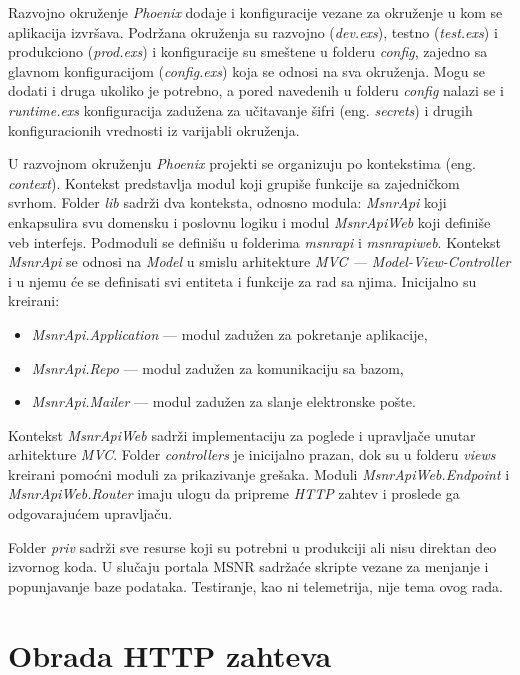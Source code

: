 \documentclass[12pt,oneside]{memoir}
\begin{document}
Razvojno okruženje \emph{Phoenix} dodaje i konfiguracije vezane za okruženje u kom se aplikacija izvršava. 
Podržana okruženja su razvojno (\emph{dev.exs}), testno (\emph{test.exs}) i produkciono (\emph{prod.exs}) i konfiguracije su smeštene u folderu \emph{config},
zajedno sa glavnom konfiguracijom (\emph{config.exs}) koja se odnosi na sva okruženja. Mogu se dodati i druga ukoliko je potrebno, a pored navedenih
u folderu \emph{config} nalazi se i \emph{runtime.exs} konfiguracija zadužena za učitavanje šifri (eng. \emph{secrets}) i drugih konfiguracionih vrednosti
iz varijabli okruženja.

U razvojnom okruženju \emph{Phoenix} projekti se organizuju po kontekstima (eng. \emph{context}). Kontekst predstavlja modul koji grupiše funkcije sa
zajedničkom svrhom. Folder \emph{lib} sadrži dva konteksta, odnosno modula: \emph{MsnrApi} koji enkapsulira svu domensku i
poslovnu logiku i modul \emph{MsnrApiWeb} koji definiše veb interfejs. Podmoduli se definišu u folderima \emph{msnr{\textunderscore}api}
i \emph{msnr{\textunderscore}api{\textunderscore}web}. 
Kontekst \emph{MsnrApi} se odnosi na \emph{Model} u smislu arhitekture \emph{MVC --- Model-View-Controller} i u njemu će se definisati svi entiteta i
funkcije za rad sa njima. Inicijalno su kreirani:
\begin{itemize}
  \item \emph{MsnrApi.Application} --- modul zadužen za pokretanje aplikacije,
  \item \emph{MsnrApi.Repo} --- modul zadužen za komunikaciju sa bazom,
  \item \emph{MsnrApi.Mailer} --- modul zadužen za slanje elektronske pošte.
\end{itemize}
Kontekst \emph{MsnrApiWeb} sadrži implementaciju za poglede i upravljače unutar arhitekture \emph{MVC}.
Folder \emph{controllers} je inicijalno prazan, dok su u folderu \emph{views} kreirani pomoćni moduli za prikazivanje grešaka.
Moduli \emph{MsnrApiWeb.Endpoint} i \emph{MsnrApiWeb.Router} imaju ulogu da pripreme \emph{HTTP} zahtev i proslede ga odgovarajućem
upravljaču.

Folder \emph{priv} sadrži sve resurse koji su potrebni u produkciji ali nisu direktan deo izvornog koda. U slučaju portala MSNR
sadržaće skripte vezane za menjanje i popunjavanje baze podataka. Testiranje, kao ni telemetrija, nije tema ovog rada.

\section{Obrada HTTP zahteva}
\end{document}
